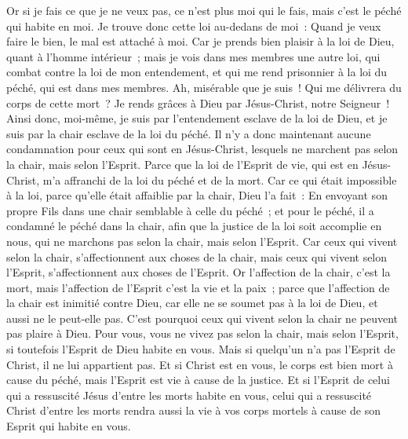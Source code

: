 \begin{multicols}{2}
Or si je fais ce que je ne veux pas, ce n'est plus moi qui le fais, mais c'est le péché qui habite en moi.
Je trouve donc cette loi au-dedans de moi~: Quand je veux faire le bien, le mal est attaché à moi.
Car je prends bien plaisir à la loi de Dieu, quant à l'homme intérieur~;
mais je vois dans mes membres une autre loi, qui combat contre la loi de mon entendement, et qui me rend prisonnier à la loi du péché, qui est dans mes membres.
Ah, misérable que je suis~! Qui me délivrera du corps de cette mort~?
Je rends grâces à Dieu par Jésus-Christ, notre Seigneur~! Ainsi donc, moi-même, je suis par l'entendement esclave de la loi de Dieu, et je suis par la chair esclave de la loi du péché.
\VerseOne{}Il n'y a donc maintenant aucune condamnation pour ceux qui sont en Jésus-Christ, lesquels ne marchent pas selon la chair, mais selon l'Esprit.
Parce que la loi de l'Esprit de vie, qui est en Jésus-Christ, m'a affranchi de la loi du péché et de la mort.
Car ce qui était impossible à la loi, parce qu'elle était affaiblie par la chair, Dieu l'a fait~: En envoyant son propre Fils dans une chair semblable à celle du péché~; et pour le péché, il a condamné le péché dans la chair,
afin que la justice de la loi soit accomplie en nous, qui ne marchons pas selon la chair, mais selon l'Esprit.
Car ceux qui vivent selon la chair, s'affectionnent aux choses de la chair, mais ceux qui vivent selon l'Esprit, s'affectionnent aux choses de l'Esprit.
Or l'affection de la chair, c'est la mort, mais l'affection de l'Esprit c'est la vie et la paix~;
parce que l'affection de la chair est inimitié contre Dieu, car elle ne se soumet pas à la loi de Dieu, et aussi ne le peut-elle pas.
C'est pourquoi ceux qui vivent selon la chair ne peuvent pas plaire à Dieu.
Pour vous, vous ne vivez pas selon la chair, mais selon l'Esprit, si toutefois l'Esprit de Dieu habite en vous. Mais si quelqu'un n'a pas l'Esprit de Christ, il ne lui appartient pas.
Et si Christ est en vous, le corps est bien mort à cause du péché, mais l'Esprit est vie à cause de la justice.
Et si l'Esprit de celui qui a ressuscité Jésus d'entre les morts habite en vous, celui qui a ressuscité Christ d'entre les morts rendra aussi la vie à vos corps mortels à cause de son Esprit qui habite en vous.

\end{multicols}
